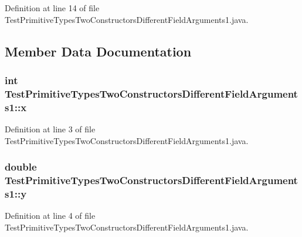 Definition at line 14 of file TestPrimitiveTypesTwoConstructorsDifferentFieldArguments1.java.



\subsection{Member Data Documentation}
\hypertarget{classTestPrimitiveTypesTwoConstructorsDifferentFieldArguments1_a6a852ce8aec44e85089a0b28b8f5e011}{
\subsubsection[{x}]{\setlength{\rightskip}{0pt plus 5cm}int {\bf TestPrimitiveTypesTwoConstructorsDifferentFieldArguments1::x}}}
\label{classTestPrimitiveTypesTwoConstructorsDifferentFieldArguments1_a6a852ce8aec44e85089a0b28b8f5e011}


Definition at line 3 of file TestPrimitiveTypesTwoConstructorsDifferentFieldArguments1.java.

\hypertarget{classTestPrimitiveTypesTwoConstructorsDifferentFieldArguments1_ab64a7a788b063deede64506ebab62066}{
\subsubsection[{y}]{\setlength{\rightskip}{0pt plus 5cm}double {\bf TestPrimitiveTypesTwoConstructorsDifferentFieldArguments1::y}}}
\label{classTestPrimitiveTypesTwoConstructorsDifferentFieldArguments1_ab64a7a788b063deede64506ebab62066}


Definition at line 4 of file TestPrimitiveTypesTwoConstructorsDifferentFieldArguments1.java.



